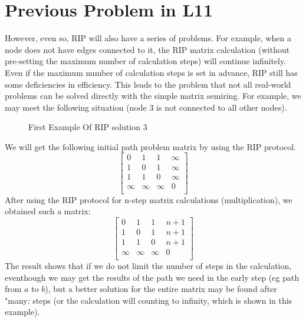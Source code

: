 \documentclass[a4paper,10pt]{article}
\begin{document}
\section{Previous Problem in L11}
However, even so, RIP will also have a series of problems. For example, when a node does not have edges connected to it, the RIP matrix calculation (without pre-setting the maximum number of calculation steps) will continue infinitely. Even if the maximum number of calculation steps is set in advance, RIP still has some deficiencies in efficiency. 
This leads to the problem that not all real-world problems can be solved directly with the simple matrix semiring. 
For example, we may meet the following situation (node 3 is not connected to all other nodes).
\begin{figure}[H]
\centering
{}
\label{example:rip:3}
\caption{First Example Of RIP solution 3}
\end{figure}
We will get the following initial path problem matrix by using the RIP protocol.
\[
\begin{bmatrix}
    0 & 1 & 1 & \infty \\
    1 & 0 & 1 & \infty \\
    1 & 1 & 0 & \infty \\
    \infty & \infty & \infty & 0 \\
\end{bmatrix}
\]
After using the RIP protocol for n-step matrix calculations (multiplication), we obtained such a matrix:
\[
\begin{bmatrix}
    0 & 1 & 1 & n+1 \\
    1 & 0 & 1 & n+1 \\
    1 & 1 & 0 & n+1 \\
    \infty & \infty & \infty & 0 \\
\end{bmatrix}
\]
The result shows that if we do not limit the number of steps in the calculation, eventhough we may get the results of the path we need in the early step (eg path from $a$ to $b$), but a better solution for the entire matrix may be found after "many: steps (or the calculation will counting to infinity, which is shown in this example).
\end{document}
